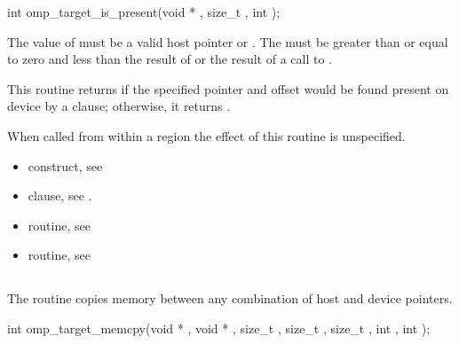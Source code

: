 \format
\begin{boxedcode}
int omp\_target\_is\_present(void * , size\_t ,
                          int );
\end{boxedcode}

\constraints

The value of  must be a valid host pointer or .
The 
must be greater than or equal to zero and less than the result of
 or the result of a call to
.

\effect

This routine returns  if the specified pointer
and offset would be found present on device  by a 
clause; otherwise, it returns .

When called from within a  region 
the effect of this routine is unspecified.

\crossreferences
\begin{itemize}
\item {} construct, see 

\item {} clause, see .

\item {} routine, see 

\item {} routine, see 
\end{itemize}


\pagebreak
{}
\subsection{}
\label{subsec:omp_target_memcpy}
\summary

The  routine copies memory between any combination
of host and device pointers.

\format
\begin{boxedcode}
int omp\_target\_memcpy(void * , void * , size\_t ,
                        size\_t , size\_t ,
                        int , int );
\end{boxedcode}

